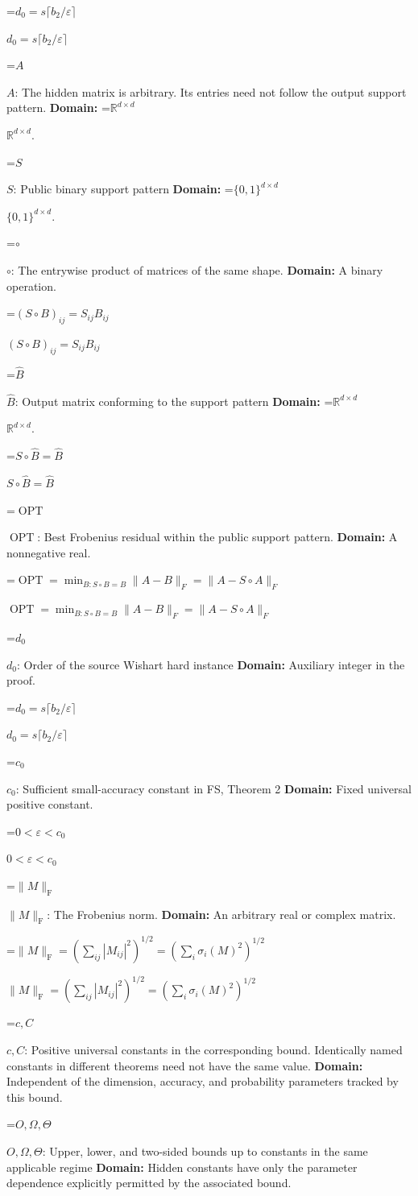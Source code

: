 \documentclass[10pt,a4paper]{article}
\newcommand{\AtlasMath}[1]{\par\begingroup\centering\setbox0=\hbox{$\displaystyle #1$}\ifdim\wd0>1.4\linewidth\typeout{ATLAS WIDE FORMULA: \the\wd0}\fi\ifdim\wd0>\linewidth\resizebox{\linewidth}{!}{\box0}\else\box0\fi\par\endgroup}
\newcommand{\AtlasInlineMath}[1]{\begingroup\setbox0=\hbox{$#1$}\ifdim\wd0>.4\linewidth\endgroup\AtlasMath{#1}\else\endgroup$#1$\fi}
\begin{document}
\AtlasInlineMath{d_0=s\lceil b_2/\varepsilon\rceil}

\AtlasInlineMath{A}: The hidden matrix is arbitrary. Its entries need not follow the output support pattern. \textbf{Domain:} \AtlasInlineMath{\mathbb R^{d\times d}}.

\AtlasInlineMath{S}: Public binary support pattern \textbf{Domain:} \AtlasInlineMath{\{0,1\}^{d\times d}}.

\AtlasInlineMath{\circ}: The entrywise product of matrices of the same shape. \textbf{Domain:} A binary operation.

\AtlasInlineMath{(S\circ B)_{ij}=S_{ij}B_{ij}}

\AtlasInlineMath{\widehat B}: Output matrix conforming to the support pattern \textbf{Domain:} \AtlasInlineMath{\mathbb R^{d\times d}}.

\AtlasInlineMath{S\circ\widehat B=\widehat B}

\AtlasInlineMath{\operatorname{OPT}}: Best Frobenius residual within the public support pattern. \textbf{Domain:} A nonnegative real.

\AtlasInlineMath{\operatorname{OPT}=\min_{B:S\circ B=B}\|A-B\|_F=\|A-S\circ A\|_F}

\AtlasInlineMath{d_0}: Order of the source Wishart hard instance \textbf{Domain:} Auxiliary integer in the proof.

\AtlasInlineMath{d_0=s\lceil b_2/\varepsilon\rceil}

\AtlasInlineMath{c_0}: Sufficient small-accuracy constant in FS, Theorem 2 \textbf{Domain:} Fixed universal positive constant.

\AtlasInlineMath{0<\varepsilon<c_0}

\AtlasInlineMath{\|M\|_{\mathrm F}}: The Frobenius norm. \textbf{Domain:} An arbitrary real or complex matrix.

\AtlasInlineMath{\|M\|_{\mathrm F}=(\sum_{ij}|M_{ij}|^2)^{1/2}=(\sum_i\sigma_i(M)^2)^{1/2}}

\AtlasInlineMath{c,C}: Positive universal constants in the corresponding bound. Identically named constants in different theorems need not have the same value. \textbf{Domain:} Independent of the dimension, accuracy, and probability parameters tracked by this bound.

\AtlasInlineMath{O,\Omega,\Theta}: Upper, lower, and two-sided bounds up to constants in the same applicable regime \textbf{Domain:} Hidden constants have only the parameter dependence explicitly permitted by the associated bound.
\end{document}
